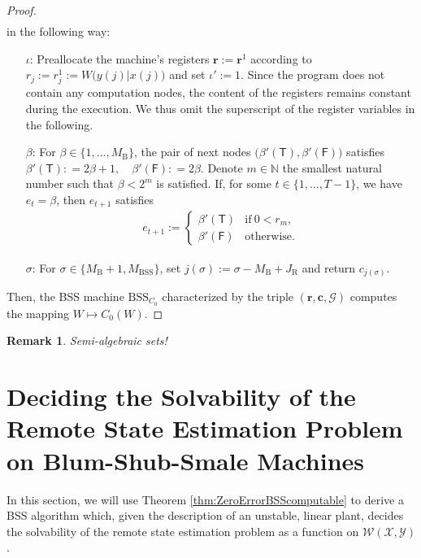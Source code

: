 \documentclass[conference]{IEEEtran}
\def\X{{\mathcal X}}
\def\Y{{\mathcal Y}}
\def\G{{\mathcal G}}
\def\W{{\mathcal W}}
\def\NN{{\mathbb N}}
\newcommand{\BSS}{\mathrm{BSS}}
\newtheorem{Remark}[Theorem]{Remark}
\begin{document}
\begin{proof}
\begin{align*}
					\end{align*}
					in the following way:
					\begin{enumerate}	\item[\(\iota\)\hspace{1pt}:] Preallocate the machine's registers \(\bm{r} := \bm{r}^1\) according to
											\(r_j := r^1_j := W\big(y(j)|x(j)\big)\) and set \(\iota' := 1\). Since the program does not contain any computation nodes,
											the content of the registers remains constant during the execution. We thus omit the superscript of the
											register variables in the following.
										\item[\(\beta\)\hspace{1pt}:] 
											For \(\beta \in \{1,\ldots, M_\mathrm{B}\}\), the pair of next nodes \(\big(\beta'(\mathsf{T}),\beta'(\mathsf{F})\big)\) satisfies
											\(	\beta'(\mathsf{T}) :    =  2\beta + 1, \quad
												\beta'(\mathsf{F}) :    =  2\beta.
											\)
											Denote \(m\in\NN\) the smallest natural number such that \(\beta < 2^m\) is satisfied. If, for some \(t\in\{1,\ldots, T-1\}\), we have
											\(e_t = \beta\), then \(e_{t+1}\) satisfies
											\begin{align*}   e_{t+1} := \begin{cases}	\beta'(\mathsf{T}) &\text{if}~ 0 < r_m,\\
																						\beta'(\mathsf{F}) &\text{otherwise}.
																		\end{cases}
											\end{align*}
										\item[\(\sigma\)\hspace{1pt}:] For \(\sigma \in \{M_\mathrm{B} +1, M_\BSS\}\), set \(j(\sigma) := \sigma - M_\mathrm{B} + J_\mathrm{R}\) 
											and return \(c_{j(\sigma)}\).
					\end{enumerate}
					Then, the BSS machine \(\BSS_{C_0}\) characterized by the triple \((\bm{r}, \bm{c}, \G)\) computes the mapping \(W\mapsto C_0(W)\).
	\end{proof}
	
	\begin{Remark}
		Semi-algebraic sets!
	\end{Remark}

\section{Deciding the Solvability of the Remote State Estimation Problem on Blum-Shub-Smale Machines}	\label{sec:DecidingRemoteStateEstimationOnBSS}
	In this section, we will use Theorem \ref{thm:ZeroErrorBSScomputable} to derive a BSS algorithm which, given the description of an unstable, linear plant,
	decides the solvability of the remote state estimation problem as a function on \(\W(\X,\Y)\).
	
\end{document}
